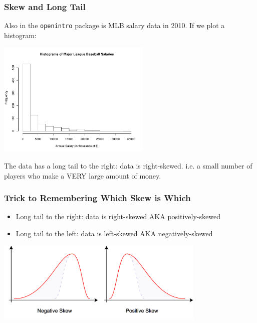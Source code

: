 \documentclass[handout]{beamer}
\newcommand{\blue}[1]{\textcolor{blue2}{#1}}
\begin{document}
\begin{frame}[fragile]
\frametitle{Skew and Long Tail}
Also in the {\tt openintro} package is MLB salary data in 2010.  If we plot a histogram:

\begin{center}
\includegraphics[height=5.5cm]{figure/MLB.pdf}
\end{center}

\pause The data has a \blue{long tail} to the right: data is \blue{right-skewed}.  i.e. a small number of players who make a VERY large amount of money.  

\end{frame}



\begin{frame}[fragile]
\frametitle{Trick to Remembering Which Skew is Which}

\begin{itemize}
\pause\item Long tail to the right: data is \blue{right-skewed} AKA \blue{positively-skewed}
\pause\item Long tail to the left: data is \blue{left-skewed} AKA \blue{negatively-skewed}
\end{itemize}

\begin{center}
\pause\includegraphics[width=10cm]{figure/skew.png}
\end{center}


\end{frame}
\end{document}
